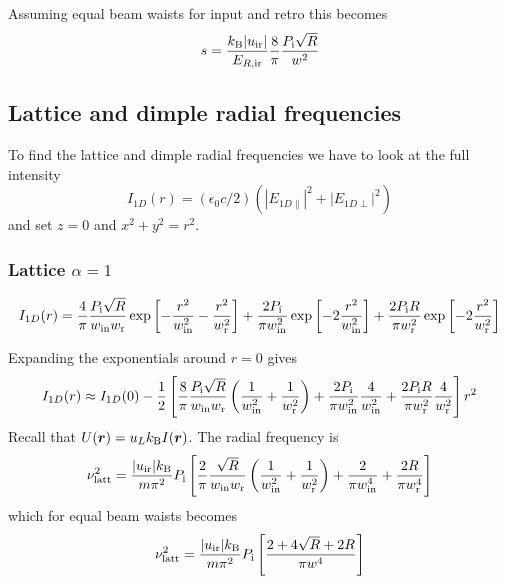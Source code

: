 Assuming equal beam waists for input and retro this becomes
\begin{equation}
  s = 
  \frac{ k_{\text{B}} |u_{\text{ir}}| }{E_{R,\text{ir}}}
  \frac{8}{\pi}  
    \frac{  P_{\text{i}} \sqrt{ R } }{ w^{2}} 
\end{equation}
 

\subsection{Lattice and dimple radial frequencies}

To find the lattice and dimple radial frequencies we have to look at the full
intensity \[I_{1D}(r) = (\epsilon_{0}c/2)( |E_{1D\parallel}|^{2} + |E_{1D\perp}|^{2} ) \] and
set $z=0$ and $x^{2}+y^{2}=r^{2}$.

\subsubsection{Lattice $\alpha=1$}

\begin{equation}
I_{1D}(r) = 
\frac{4}{\pi} \frac{ P_{\text{i}} \sqrt{R}}{  w_{\text{in}}  w_{\text{r}}} 
    \exp\left[-\frac{r^2}{ w_{\text{in}}^{2}} - \frac{r^{2}}{ w_{\text{r}}^{2}} \right]
+
\frac{2  P_{\text{i}} }{\pi  w_{\text{in}}^{2}}
\exp\left[-2\frac{ r^2}{ w_{\text{in}}^{2}}\right]
+\frac{2  P_{\text{i}} R }{\pi  w_{\text{r}}^{2}} 
  \exp\left[-2\frac{ r^2}{ w_{\text{r}}^{2}}\right]
\end{equation}

Expanding the exponentials around $r=0$ gives 
\begin{equation}
I_{1D}(r) \approx I_{1D}(0)  - \frac{1}{2} 
\left[ 
\frac{8}{\pi} \frac{ P_{\text{i}} \sqrt{R}}{  w_{\text{in}}  w_{\text{r}}}
 \left( \frac{1}{ w_{\text{in}}^{2}} +  \frac{1}{ w_{\text{r}}^{2}} \right) 
+ 
\frac{2  P_{\text{i}} }{\pi  w_{\text{in}}^{2}} \frac{4}{ w_{\text{in}}^{2}} 
+ 
\frac{2  P_{\text{i}} R}{\pi  w_{\text{r}}^{2}} \frac{4}{ w_{\text{r}}^{2}} 
\right] r^{2}	
\end{equation}
Recall that $U(\bm{r}) = u_{L}k_{\text{B}} I(\bm{r})$.  The radial frequency is 
\begin{equation}
 \nu_{\text{latt}}^{2} = 
 \frac{|u_{\text{ir}}| k_{\text{B}} }{m\pi^{2}}
  P_{\text{i}}
\left[
\frac{2}{\pi} \frac{\sqrt{R}}{  w_{\text{in}}  w_{\text{r}}}
 \left( \frac{1}{ w_{\text{in}}^{2}} +  \frac{1}{ w_{\text{r}}^{2}} \right) 
+ 
\frac{2  }{\pi  w_{\text{in}}^{4}} 
+ 
\frac{2 R}{\pi  w_{\text{r}}^{4}}
\right]
\end{equation}
which for equal beam waists becomes 
\begin{equation}
 \nu_{\text{latt}}^{2} = 
 \frac{|u_{\text{ir}}| k_{\text{B}} }{m\pi^{2}}
  P_{\text{i}}
\left[
\frac{2 + 4 \sqrt{R} + 2R}{ \pi w^{4} }
\right]
\end{equation}

